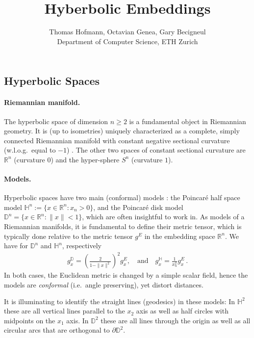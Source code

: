 \documentclass{article}
\title{Hyberbolic Embeddings}
\author{Thomas Hofmann, Octavian Genea, Gary Becigneul\\[2mm] Department of Computer Science, ETH Zurich}
\renewcommand{\Re}{{\mathbb R}}
\begin{document}
\maketitle

\subsection*{Hyperbolic Spaces}

\paragraph{Riemannian manifold.} The hyperbolic space of dimension $n \geq 2$ is a fundamental object in Riemannian geometry. It is (up to isometries) uniquely characterized as a complete, simply connected Riemannian manifold with  constant negative sectional curvature (w.l.o.g.~equal to $-1$) \cite{martelli2014hyperbolic}. The other two spaces of constant sectional curvature are $\Re^n$ (curvature $0$) and the hyper-sphere $S^n$ (curvature $1$).  

\paragraph{Models.} Hyperbolic spaces have two main (conformal) models \cite{anderson2006hyperbolic}: the Poin\-car\'e half space model $\mathbb H^n := \{x \in \mathbb \Re^n: x_n >0\}$, and the Poincar\'e disk model $\mathbb D^n = \{ x \in \mathbb \Re^n: \| x\| <1\}$, which are often insightful to work in. As models of a Riemannian manifolds, it is fundamental to define their metric tensor, which is typically done relative to the metric tensor $g^E$ in the embedding space $\Re^n$. We have for $\mathbb D^n$ and $\mathbb H^n$, respectively
\begin{align}
g^{\mathbb D}_x = \left( \frac 2 {1- \|x\|^2}\right)^2 g_x^E, \quad \text{and} \quad 
g^{\mathbb H}_x=  \frac 1{x_n^2}  g_x^E\,.
\end{align}
In both cases, the Euclidean metric is changed by a simple scalar field, hence the models are \textit{conformal} (i.e.~angle preserving), yet distort distances. 

It is illuminating to identify the straight lines (geodesics) in these models: In $\mathbb H^2$ these are all vertical lines parallel to the $x_2$ axis as well as half circles with midpoints on the $x_1$ axis. In $\mathbb D^2$ these are all lines through the origin as well as all circular arcs that are orthogonal to $\partial \mathbb D^2$.
\end{document}
